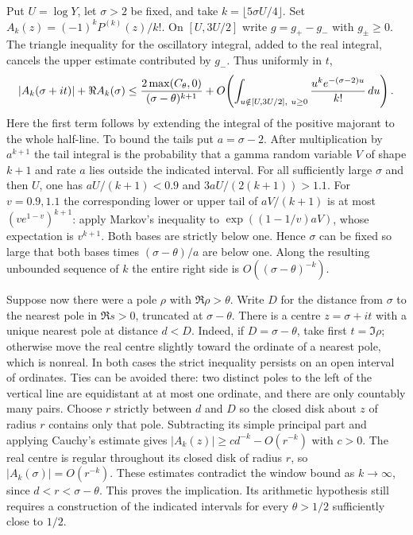 \documentclass[11pt]{amsart}
\theoremstyle{definition}
\theoremstyle{remark}
\begin{document}
Put $U=\log Y$, let $\sigma>2$ be fixed, and take
$k=\lfloor5\sigma U/4\rfloor$. Set $A_k(z)=(-1)^kP^{(k)}(z)/k!$.
On $[U,3U/2]$ write $g=g_+-g_-$ with $g_\pm\ge0$. The triangle
inequality for the oscillatory integral, added to the real integral,
cancels the upper estimate contributed by $g_-$. Thus uniformly in $t$,
\[
 |A_k(\sigma+it)|+\Re A_k(\sigma)
 \le {2\max(C_\theta,0)\over(\sigma-\theta)^{k+1}}
 +O\!\left(\int_{u\notin[U,3U/2],\ u\ge0}
          {u^k e^{-(\sigma-2)u}\over k!}\,du\right).
\]
Here the first term follows by extending the integral of the positive
majorant to the whole half-line. To bound the tails put $a=\sigma-2$.
After multiplication by $a^{k+1}$ the tail integral is the probability
that a gamma random variable $V$ of shape $k+1$ and rate $a$ lies
outside the indicated interval. For all sufficiently large $\sigma$
and then $U$, one has $aU/(k+1)<0.9$ and $3aU/(2(k+1))>1.1$.
For $v=0.9,1.1$ the corresponding lower or upper tail of $aV/(k+1)$
is at most $(v e^{1-v})^{k+1}$: apply Markov's inequality to
$\exp((1-1/v)aV)$, whose expectation is $v^{k+1}$.
Both bases are strictly below one. Hence $\sigma$ can be fixed so large
that both bases times $(\sigma-\theta)/a$ are below one. Along the
resulting unbounded sequence of $k$ the entire right side is
$O((\sigma-\theta)^{-k})$.

Suppose now there were a pole $\rho$ with $\Re\rho>\theta$. Write
$D$ for the distance from $\sigma$ to the nearest pole in $\Re s>0$,
truncated at $\sigma-\theta$. There is a centre $z=\sigma+it$ with a
unique nearest pole at distance $d<D$. Indeed, if $D=\sigma-\theta$,
take first $t=\Im\rho$; otherwise move the real centre slightly
toward the ordinate of a nearest pole, which is nonreal. In both cases
the strict inequality persists on an open interval of ordinates.
Ties can be avoided there: two distinct poles to the left of the
vertical line are equidistant at at most one ordinate, and there are
only countably many pairs. Choose $r$ strictly between $d$ and $D$
so the closed disk about $z$ of radius $r$ contains only that pole.
Subtracting its simple principal part and applying Cauchy's estimate
gives $|A_k(z)|\ge c d^{-k}-O(r^{-k})$ with $c>0$.
The real centre is regular throughout its closed disk of radius $r$,
so $|A_k(\sigma)|=O(r^{-k})$. These estimates contradict the window
bound as $k\to\infty$, since $d<r<\sigma-\theta$.
This proves the implication. Its arithmetic hypothesis still requires
a construction of the indicated intervals for every $\theta>1/2$
sufficiently close to $1/2$.
\end{document}
